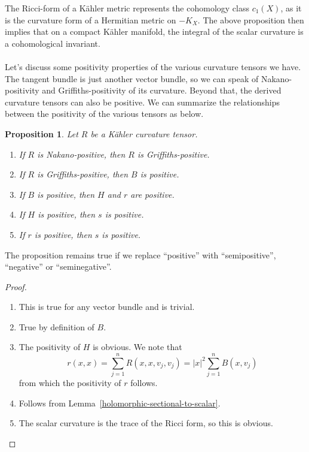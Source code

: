 \documentclass[11pt]{article}
\newtheorem{prop}[theo]{Proposition}
\theoremstyle{definition}
\begin{document}
The Ricci-form of a K\"ahler metric represents the cohomology class $c_1(X)$, as it is the curvature form of a Hermitian metric on $-K_X$. The above proposition then implies that on a compact K\"ahler manifold, the integral of the scalar curvature is a cohomological invariant.



\paragraph{}

Let's discuss some positivity properties of the various curvature tensors we have. The tangent bundle is just another vector bundle, so we can speak of Nakano-positivity and Griffiths-positivity of its curvature. Beyond that, the derived curvature tensors can also be positive. We can summarize the relationships between the positivity of the various tensors as below.


\begin{prop}
\label{derived-tensor-positivity}
  Let $R$ be a K\"ahler curvature tensor.
  \begin{enumerate}
    \item If $R$ is Nakano-positive, then $R$ is Griffiths-positive.
    \item If $R$ is Griffiths-positive, then $B$ is positive.
    \item If $B$ is positive, then $H$ and $r$ are positive.
    \item If $H$ is positive, then $s$ is positive.
    \item If $r$ is positive, then $s$ is positive.
  \end{enumerate}
\end{prop}

The proposition remains true if we replace ``positive'' with ``semipositive'', ``negative'' or ``seminegative''.

\begin{proof}
  \begin{enumerate}
  \item This is true for any vector bundle and is trivial.
  \item True by definition of $B$.
  \item The positivity of $H$ is obvious. We note that
    $$
    r(x,x) = \sum_{j=1}^n R(x,x,v_j,v_j) = |x|^2 \sum_{j=1}^n B(x,v_j)
    $$
    from which the positivity of $r$ follows.
  \item Follows from Lemma~\ref{holomorphic-sectional-to-scalar}.
  \item The scalar curvature is the trace of the Ricci form, so this is obvious.
  \end{enumerate}
\end{proof}
\end{document}
